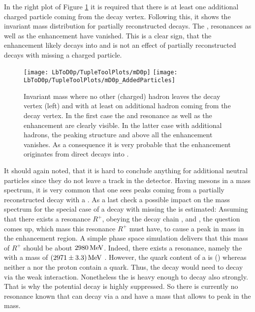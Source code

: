 In the right plot of Figure \ref{fig:mD0p_AdditionalParticles} it is required that there is at least one additional charged particle coming from the \Dz\proton\mun decay vertex.
Following this, it shows the invariant \Dz\proton mass distribution for partially reconstructed decays.
The \LcResI, \LcResII resonances as well as the enhancement have vanished.
This is a clear sign, that the enhancement likely decays into \Dz\proton and is not an effect of partially reconstructed decays with missing a charged particle.
\begin{figure}[tb]
	\centering
	\texttt{[image: LbToD0p/TupleToolPlots/mD0p]}
	\texttt{[image: LbToD0p/TupleToolPlots/mD0p\_AddedParticles]}
	\caption{Invariant \Dz\proton mass where no other (charged) hadron leaves the \Dz\proton\mun decay vertex (left) and with at least on additional hadron coming from the \Dz\proton\mun decay vertex.
             In the first case the \LcResI and \LcResII resonance as well as the enhancement are clearly visible.
             In the latter case with additional hadrons, the peaking structure and above all the enhancement vanishes. 
             As a consequence it is very probable that the enhancement originates from direct decays into \Dz\proton.
    }
	\label{fig:mD0p_AdditionalParticles}
\end{figure}

It should again noted, that it is hard to conclude anything for additional neutral particles since they do not leave a track in the detector.
Having \D mesons in a mass spectrum, it is very common that one sees peaks coming from a partially reconstructed decay with a \decay{\Dstar}{\D\pion}.
As a last check a possible impact on the \Dz\proton mass spectrum for the special case of a \decay{\Dstarz}{\Dz\piz} decay with missing the \piz is estimated:
Assuming that there exists a resonance $R^{+}$, obeying the decay chain ,  and \decay{\Dstarz}{\Dz\piz}, the question comes up, which mass this resonance $R^{+}$ must have, to cause a peak in \Dz\proton mass in the enhancement region.
A simple phase space simulation delivers that this mass of $R^{+}$ should be about $2980\mathrm{\,Me\kern -0.1em V}$.
Indeed, there exists a resonance, namely the  with a mass of $(2971 \pm 3.3)\mathrm{\,Me\kern -0.1em V}$ \cite{PDG}.
However, the quark content of a \Xicp is (\uquark\cquark\squark) whereas neither a \Dstarz nor the proton contain a \squark quark.
Thus, the decay  would need to decay via the weak interaction.
Nonetheless the  is heavy enough to decay also strongly. 
That is why the potential decay  is highly suppressed.
So there is currently no resonance known that can decay via a \Dstarz\proton and have a mass that allows to peak in the \Dz\proton mass.

